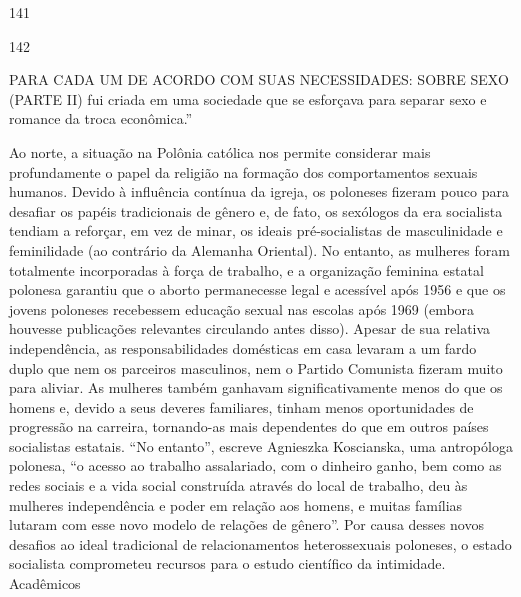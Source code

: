  \par 
141
 \par 
142
 \par 
PARA CADA UM DE ACORDO COM SUAS NECESSIDADES: SOBRE SEXO (PARTE II) fui criada em uma sociedade que se esforçava para separar sexo e romance da troca econômica.”
 \par 
Ao norte, a situação na Polônia católica nos permite considerar mais profundamente o papel da religião na formação dos comportamentos sexuais humanos. Devido à influência contínua da igreja, os poloneses fizeram pouco para desafiar os papéis tradicionais de gênero e, de fato, os sexólogos da era socialista tendiam a reforçar, em vez de minar, os ideais pré-socialistas de masculinidade e feminilidade (ao contrário da Alemanha Oriental). No entanto, as mulheres foram totalmente incorporadas à força de trabalho, e a organização feminina estatal polonesa garantiu que o aborto permanecesse legal e acessível após 1956 e que os jovens poloneses recebessem educação sexual nas escolas após 1969 (embora houvesse publicações relevantes circulando antes disso). Apesar de sua relativa independência, as responsabilidades domésticas em casa levaram a um fardo duplo que nem os parceiros masculinos, nem o Partido Comunista fizeram muito para aliviar. As mulheres também ganhavam significativamente menos do que os homens e, devido a seus deveres familiares, tinham menos oportunidades de progressão na carreira, tornando-as mais dependentes do que em outros países socialistas estatais. “No entanto”, escreve Agnieszka Koscianska, uma antropóloga polonesa, “o acesso ao trabalho assalariado, com o dinheiro ganho, bem como as redes sociais e a vida social construída através do local de trabalho, deu às mulheres independência e poder em relação aos homens, e muitas famílias lutaram com esse novo modelo de relações de gênero”. Por causa desses novos desafios ao ideal tradicional de relacionamentos heterossexuais poloneses, o estado socialista comprometeu recursos para o estudo científico da intimidade. Acadêmicos
 \par 
